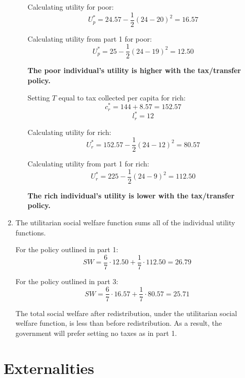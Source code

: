 \documentclass{article}
\begin{document}
\begin{enumerate}[1.]
\begin{enumerate}[a.]
                Calculating utility for poor:
                $$ U_{p}^{*} = 24.57 - \frac{ 1 }{ 2 } ( 24 - 20 )^{2} = 16.57 $$

                Calculating utility from part 1 for poor:
                $$ U_{p}^{*} = 25 - \frac{ 1 }{ 2 } ( 24 - 19 )^{2} = 12.50 $$

                \textbf{The poor individual's utility is higher with the
                tax/transfer policy.}

                \bigbreak

                Setting $T$ equal to tax collected per capita for rich:
                $$ c_{r}^{*} = 144 + 8.57 = 152.57 $$
                $$ l_{r}^{*} = 12 $$

                Calculating utility for rich:
                $$ U_{r}^{*} = 152.57 - \frac{ 1 }{ 2 } ( 24 - 12 )^{2} = 80.57$$

                Calculating utility from part 1 for rich:
                $$ U_{r}^{*} = 225 - \frac{ 1 }{ 2 } ( 24 -  9 )^{2} = 112.50$$

                \textbf{The rich individual's utility is lower with the
                tax/transfer policy.}

        \end{enumerate}

    \item The utilitarian social welfare function sums all of the individual
        utility functions.
        
        \bigbreak

        For the policy outlined in part 1:
        $$ SW = \frac{ 6 }{ 7 } \cdot 12.50 + \frac{ 1 }{ 7 } \cdot 112.50 =
        26.79 $$

        For the policy outlined in part 3:
        $$ SW = \frac{ 6 }{ 7 } \cdot 16.57 + \frac{ 1 }{ 7 } \cdot 80.57 =
        25.71 $$

        The total social welfare after redistribution, under the utilitarian
        social welfare function, is less than before redistribution. As a
        result, the government will prefer setting no taxes as in part 1.
\end{enumerate}

\section{ Externalities }
\end{document}
